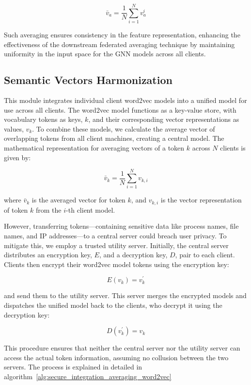 \[
\bar{v}_a = \frac{1}{N} \sum_{i=1}^{N} v_a^i
\]

Such averaging ensures consistency in the feature representation, enhancing the effectiveness of the downstream federated averaging technique by maintaining uniformity in the input space for the GNN models across all clients.

\subsection{Semantic Vectors Harmonization}
This module integrates individual client word2vec models into a unified model for use across all clients. The word2vec model functions as a key-value store, with vocabulary tokens as keys, \(k\), and their corresponding vector representations as values, \(v_k\). To combine these models, we calculate the average vector of overlapping tokens from all client machines, creating a central model. The mathematical representation for averaging vectors of a token \(k\) across \(N\) clients is given by:

\[
\bar{v}_k = \frac{1}{N} \sum_{i=1}^{N} v_{k,i}
\]

where \(\bar{v}_k\) is the averaged vector for token \(k\), and \(v_{k,i}\) is the vector representation of token \(k\) from the \(i\)-th client model.

However, transferring tokens—containing sensitive data like process names, file names, and IP addresses—to a central server could breach user privacy. To mitigate this, we employ a trusted utility server. Initially, the central server distributes an encryption key, \(E\), and a decryption key, \(D\), pair to each client. Clients then encrypt their word2vec model tokens using the encryption key:

\[
E(v_{k}) = v_{k}^{'}
\]

and send them to the utility server. This server merges the encrypted models and dispatches the unified model back to the clients, who decrypt it using the decryption key:

\[
D(v_{k}^{'}) = v_{k}
\]

This procedure ensures that neither the central server nor the utility server can access the actual token information, assuming no collusion between the two servers. The process is explained in detailed in algorithm~\ref{alg:secure_integration_averaging_word2vec}

